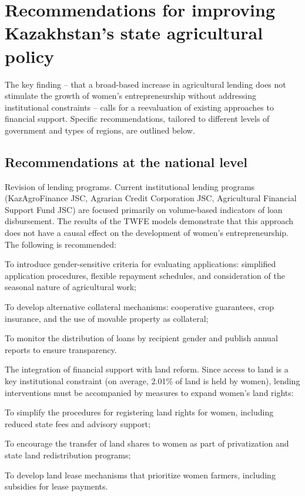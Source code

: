 ﻿\documentclass[pdflatex,sn-mathphys-ay]{sn-jnl}
\begin{document}
\section{Recommendations for improving Kazakhstan's state agricultural policy}

The key finding -- that a broad-based increase in agricultural lending
does not stimulate the growth of women's entrepreneurship without
addressing institutional constraints -- calls for a reevaluation of
existing approaches to financial support. Specific recommendations,
tailored to different levels of government and types of regions, are
outlined below.

\subsection{Recommendations at the national level}

Revision of lending programs. Current institutional lending programs
(KazAgroFinance JSC, Agrarian Credit Corporation JSC, Agricultural
Financial Support Fund JSC) are focused primarily on volume-based
indicators of loan disbursement. The results of the TWFE models demonstrate
that this approach does not have a causal effect on the development of
women's entrepreneurship. The following is recommended:

To introduce gender-sensitive criteria for evaluating applications:
simplified application procedures, flexible repayment schedules, and
consideration of the seasonal nature of agricultural work;

To develop alternative collateral mechanisms: cooperative guarantees,
crop insurance, and the use of movable property as collateral;

To monitor the distribution of loans by recipient gender and publish
annual reports to ensure transparency.

The integration of financial support with land reform. Since access to
land is a key institutional constraint (on average, 2.01\% of land is
held by women), lending interventions must be accompanied by measures to
expand women's land rights:

To simplify the procedures for registering land rights for women,
including reduced state fees and advisory support;

To encourage the transfer of land shares to women as part of
privatization and state land redistribution programs;

To develop land lease mechanisms that prioritize women farmers,
including subsidies for lease payments.
\end{document}
